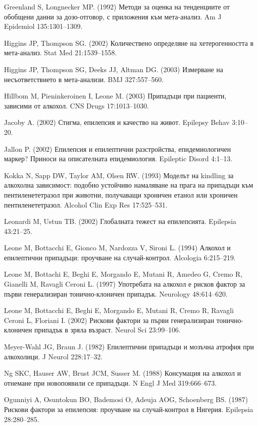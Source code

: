 \documentclass{article}
\begin{document}
Greenland S, Longnecker MP. (1992) Методи за оценка на тенденциите от обобщени данни за дозо-отговор, с приложения към мета-анализ. Am J Epidemiol 135:1301–1309.

Higgins JP, Thompson SG. (2002) Количествено определяне на хетерогенността в мета-анализ. Stat Med 21:1539–1558.

Higgins JP, Thompson SG, Deeks JJ, Altman DG. (2003) Измерване на несъответствието в мета-анализи. BMJ 327:557–560.

Hillbom M, Pieninkeroinen I, Leone M. (2003) Припадъци при пациенти, зависими от алкохол. CNS Drugs 17:1013–1030.

Jacoby A. (2002) Стигма, епилепсия и качество на живот. Epilepsy Behav 3:10–20.

Jallon P. (2002) Епилепсия и епилептични разстройства, епидемиологичен маркер? Приноси на описателната епидемиология. Epileptic Disord 4:1–13.

Kokka N, Sapp DW, Taylor AM, Olsen RW. (1993) Моделът на kindling за алкохолна зависимост: подобно устойчиво намаляване на прага на припадъци към пентиленететразол при животни, получаващи хроничен етанол или хроничен пентиленететразол. Alcohol Clin Exp Res 17:525–531.

Leonardi M, Ustun TB. (2002) Глобалната тежест на епилепсията. Epilepsia 43:21–25.

Leone M, Bottacchi E, Gionco M, Nardozza V, Sironi L. (1994) Алкохол и епилептични припадъци: проучване на случай-контрол. Alcologia 6:215–219.

Leone M, Bottachi E, Beghi E, Morgando E, Mutani R, Amedeo G, Cremo R, Gianelli M, Ravagli Ceroni L. (1997) Употребата на алкохол е рисков фактор за първи генерализиран тонично-клоничен припадък. Neurology 48:614–620.

Leone M, Bottacchi E, Beghi E, Morgando E, Mutani R, Cremo R, Ravagli Ceroni L, Floriani I. (2002) Рискови фактори за първи генерализиран тонично-клоничен припадък в зряла възраст. Neurol Sci 23:99–106.

Meyer-Wahl JG, Braun J. (1982) Епилептични припадъци и мозъчна атрофия при алкохолици. J Neurol 228:17–32.

Ng SKC, Hauser AW, Brust JCM, Susser M. (1988) Консумация на алкохол и отнемане при новопоявили се припадъци. N Engl J Med 319:666–673.

Ogunniyi A, Osuntokun BO, Bademosi O, Adeuja AOG, Schoenberg BS. (1987) Рискови фактори за епилепсия: проучване на случай-контрол в Нигерия. Epilepsia 28:280–285.
\end{document}
